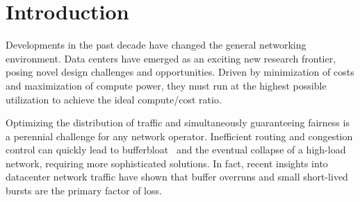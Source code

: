 
\section{Introduction}
\label{sec:intro}

%
%

Developments in the past decade have changed the general networking 
environment. Data centers have emerged as an exciting new research frontier, 
posing novel design challenges and opportunities. Driven by minimization of 
costs and maximization of compute power, they must run at the highest 
possible utilization to achieve the ideal compute/cost ratio.

Optimizing the distribution of traffic and simultaneously guaranteeing fairness is a perennial challenge for any network operator.
Inefficient routing and congestion control can quickly lead to 
bufferbloat~\cite{bufferbloat} and the eventual collapse of a high-load 
network, requiring more sophisticated solutions. In fact, recent insights into 
datacenter network traffic have shown that buffer overruns and small 
short-lived bursts are the primary factor of loss.\cite{fb_dc,msr_dc,dctcp}

